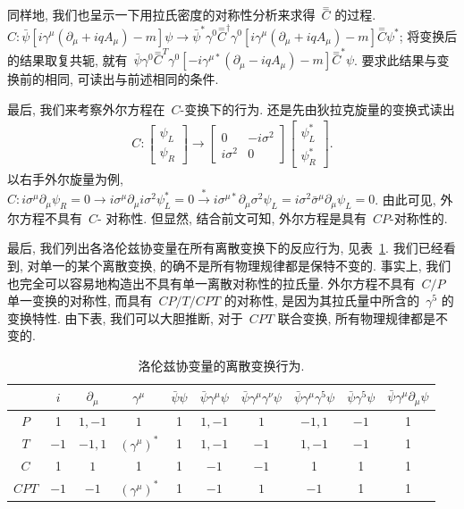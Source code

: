 同样地, 我们也呈示一下用拉氏密度的对称性分析来求得~$\overset{=}{C}$ 的过程. $C:\bar{\psi}[i\gamma^\mu(\partial_\mu+iqA_\mu)-m]\psi\rightarrow\bar{\psi}^*\gamma^0\overset{=}{C}^\dag\gamma^0[i\gamma^\mu(\partial_\mu+iqA_\mu)-m]\overset{=}{C}\psi^*$; 将变换后的结果取复共轭, 就有~$\bar{\psi}\gamma^0\overset{=}{C}^T\gamma^0[-i\gamma^{\mu*}(\partial_\mu-iqA_\mu)-m]\overset{=}{C}^*\psi$. 要求此结果与变换前的相同, 可读出与前述相同的条件.

最后, 我们来考察外尔方程在~$C$-变换下的行为. 还是先由狄拉克旋量的变换式读出
\begin{align}
C:\left[\begin{array}{c}\psi_L\\\psi_R\end{array}\right]\rightarrow\left[\begin{array}{cc}0&-i\sigma^2\\i\sigma^2&0\end{array}\right]
\left[\begin{array}{c}\psi^*_L\\\psi^*_R\end{array}\right].
\end{align}
以右手外尔旋量为例, $C:i\sigma^\mu\partial_\mu\psi_R=0\rightarrow i\sigma^\mu\partial_\mu i\sigma^2\psi^*_L=0\overset{*}{\rightarrow}i\sigma^{\mu*}\partial_\mu\sigma^2\psi_L=i\sigma^2\bar{\sigma}^\mu\partial_\mu\psi_L=0$. 由此可见, 外尔方程不具有~$C$- 对称性. 但显然, 结合前文可知, 外尔方程是具有~$CP$-对称性的.





最后, 我们列出各洛伦兹协变量在所有离散变换下的反应行为, 见表~\ref{biao2}. 我们已经看到, 对单一的某个离散变换, 的确不是所有物理规律都是保特不变的. 事实上, 我们也完全可以容易地构造出不具有单一离散对称性的拉氏量. 外尔方程不具有~$C/P$ 单一变换的对称性, 而具有~$CP/T/CPT$ 的对称性, 是因为其拉氏量中所含的~$\gamma^5$ 的变换特性. 由下表, 我们可以大胆推断, 对于~$CPT$ 联合变换, 所有物理规律都是不变的.
\begin{table}[!h]
\small
\begin{center}
\begin{tabular}{c|ccc|cccccc}
   &$i$ &$\partial_\mu$ &$\gamma^\mu$ & $\bar{\psi}\psi$ & $\bar{\psi}\gamma^\mu\psi$ & $\bar{\psi}\gamma^\mu\gamma^\nu\psi$ & $\bar{\psi}\gamma^\mu\gamma^5\psi$ & $\bar{\psi}\gamma^5\psi$ & $\bar{\psi}\gamma^\mu\partial_\mu\psi$  \\
  \hline
  $P$ &1& $1,-1$ & $1$&1&$1,-1$&$1$&$-1,1$&$-1$&1 \\
  $T$ &$-1$& $-1,1$ & $(\gamma^\mu)^*$&1&$1,-1$&$-1$&$1,-1$&$-1$& 1\\
  $C$ &1& $1$&1&1&$-1$&$-1$&1&1&1\\
  $CPT$&$-1$&$-1$&$(\gamma^\mu)^*$&1&$-1$&$1$&$-1$&1&1
\end{tabular}
\caption{洛伦兹协变量的离散变换行为.}\label{biao2}
\end{center}
\end{table}



